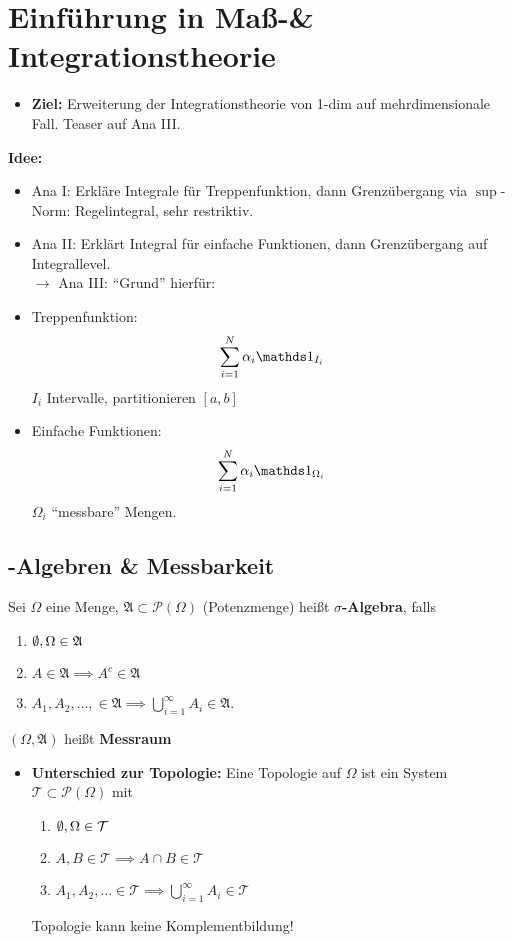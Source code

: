 \section{Einführung in Maß-\& Integrationstheorie}
\begin{itemize}
	\item \textbf{Ziel:} Erweiterung der Integrationstheorie von 1-dim auf mehrdimensionale Fall.
		Teaser auf Ana III.
\end{itemize}
\textbf{Idee:}
\begin{itemize}
	\item Ana I: Erkläre Integrale für Treppenfunktion, dann Grenzübergang via $ \sup $-Norm: Regelintegral, sehr restriktiv.
	\item Ana II: Erklärt Integral für einfache Funktionen, dann Grenzübergang auf Integrallevel.\\
		$ \to  $ Ana III: ``Grund'' hierfür:
	\item Treppenfunktion:
		\[
			\sum_{i=1}^{N} \alpha_i \I_{I_i} 
		\]
		$ I_i $ Intervalle, partitionieren $ [a, b] $ 
	\item Einfache Funktionen:
		\[
			\sum_{i=1}^{N} \alpha_i \I_{\Omega_i} 
		\]
		$ \Omega_i $ ``messbare'' Mengen.
\end{itemize}

\subsection{\mathsec{\sigma}{}-Algebren \& Messbarkeit}
\begin{definition}
	Sei $ \Omega  $ eine Menge, $ \mathfrak{A} \subset \mathcal{P} (\Omega) $ (Potenzmenge) heißt \textbf{$ \sigma $-Algebra}, falls
	\begin{enumerate}[label=(\roman*)]
		\item $ \emptyset , \Omega \in \mathfrak{A}  $ 
		\item $ A \in \mathfrak{A} \implies A^c \in \mathfrak{A}  $ 
		\item $ A_1, A_2, \dotsc, \in \mathfrak{A} \implies \bigcup_{i = 1} ^{\infty} A_i \in \mathfrak{A}  $.
	\end{enumerate}
	$ (\Omega, \mathfrak{A} ) $ heißt \textbf{Messraum}
\end{definition}
\begin{itemize}
	\item \textbf{Unterschied zur Topologie:} Eine Topologie auf $ \Omega $ ist ein System $ \mathcal{T} \subset \mathcal{P} (\Omega) $ mit
		\begin{enumerate}[label=(\roman*)]
			\item $ \emptyset , \Omega \in \mathcal{T}  $ 
			\item $ A, B \in \mathcal{T} \implies A \cap B \in \mathcal{T}  $ 
			\item $ A_1, A_2, \dotsc \in \mathcal{T} \implies \bigcup_{i = 1} ^{\infty} A_i \in \mathcal{T}  $
		\end{enumerate}
		Topologie kann keine Komplementbildung!
\end{itemize}

